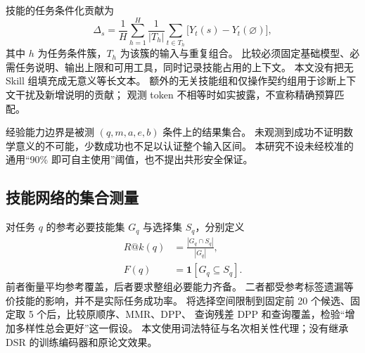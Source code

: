 技能的任务条件化贡献为
\begin{equation}
\Delta_s=\frac{1}{H}\sum_{h=1}^{H}\frac{1}{|T_h|}
\sum_{t\in T_h}\bigl[Y_t(s)-Y_t(\varnothing)\bigr],
\label{eq:utility}
\end{equation}
其中 $h$ 为任务条件簇，$T_h$ 为该簇的输入与重复组合。
比较必须固定基础模型、必需任务说明、输出上限和可用工具，同时记录技能占用的上下文。
本文没有把无 Skill 组填充成无意义等长文本。
额外的无关技能组和仅操作契约组用于诊断上下文干扰及新增说明的贡献；
观测 token 不相等时如实披露，不宣称精确预算匹配。

经验能力边界是被测 $(q,m,a,e,b)$ 条件上的结果集合。
未观测到成功不证明数学意义的不可能，少数成功也不足以认证整个输入区间。
本研究不设未经校准的通用“90\% 即可自主使用”阈值，也不提出共形安全保证。

\subsection{技能网络的集合测量}
对任务 $q$ 的参考必要技能集 $G_q$ 与选择集 $S_q$，分别定义
\begin{align}
R@k(q)&=\frac{|G_q\cap S_q|}{|G_q|},\\
F(q)&=\mathbf{1}[G_q\subseteq S_q].
\end{align}
前者衡量平均参考覆盖，后者要求整组必要能力齐备。
二者都受参考标签遗漏等价技能的影响，并不是实际任务成功率。
将选择空间限制到固定前 20 个候选、固定取 5 个后，比较原顺序、MMR、DPP、
查询残差 DPP 和查询覆盖，检验“增加多样性总会更好”这一假设。
本文使用词法特征与名次相关性代理；没有继承 DSR 的训练编码器和原论文效果\citep{P05,P38}。
